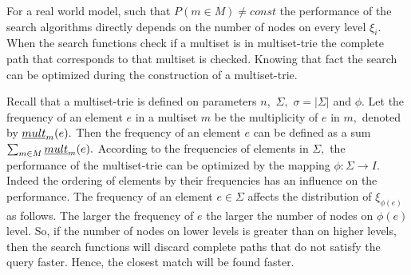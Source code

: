 \documentclass[10pt,letterpaper]{article}
\newtheorem{lemma}{Lemma}
\begin{document}
For a real world model, such that $P(m\in M)\neq const$ the performance of the search 
algorithms directly depends on the number of nodes on every level $\xi_i.$ When 
the search functions check if a multiset is in multiset-trie the complete path that 
corresponds to that multiset is checked. Knowing that fact the search can be optimized 
during the construction of a multiset-trie. 

Recall that a multiset-trie is defined on parameters $n,$ $\Sigma,$ $\sigma = |\Sigma|$ 
and $\phi.$ Let the frequency of an element $e$ in a multiset $m$ be the multiplicity of 
$e$ in $m,$ denoted by $\emph{mult}_m(e).$ Then the frequency of an element $e$ 
can be defined as a sum $\sum_{m\in M} \emph{mult}_m(e).$ According to the frequencies 
of elements in $\Sigma,$ the performance of the multiset-trie can be optimized by 
the mapping $\phi : \Sigma \rightarrow I.$ Indeed the ordering of elements by their 
frequencies has an influence on the performance.
%
The frequency of an element $e\in\Sigma$ affects the distribution of $\xi_{\phi(e)}$ 
as follows. The larger the frequency of $e$ the larger the number of nodes on 
$\phi(e)$ level. 
So, if the number of nodes on lower levels is greater than on higher levels, then 
the search functions will discard complete paths that do not satisfy the query 
faster. Hence, the closest match will be found faster.

%
\end{document}
